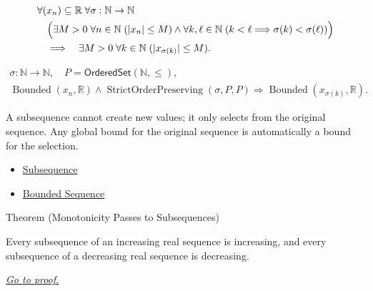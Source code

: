\begin{remark*}
\[
\begin{aligned}
&\forall (x_n)\subseteq\mathbb{R}\;\forall \sigma:\mathbb{N}\to\mathbb{N}\\
&\quad\Bigl(
  \exists M>0\;\forall n\in\mathbb{N}\;(|x_n|\le M)
  \land
  \forall k,\ell\in\mathbb{N}\;(k<\ell\Longrightarrow\sigma(k)<\sigma(\ell))
\Bigr)\\
&\quad\Longrightarrow\quad
\exists M>0\;\forall k\in\mathbb{N}\;(|x_{\sigma(k)}|\le M).
\end{aligned}
\]
\end{remark*}

\begin{remark*}
\[
\begin{gathered}
\sigma\colon\mathbb{N}\to\mathbb{N},\quad
P=\mathsf{OrderedSet}(\mathbb{N},\leq),\\
\operatorname{Bounded}(x_n,\mathbb{R})
\land
\operatorname{StrictOrderPreserving}(\sigma,P,P)
\Longrightarrow
\operatorname{Bounded}(x_{\sigma(k)},\mathbb{R}).
\end{gathered}
\]
\end{remark*}

\begin{remark*}[Interpretation]
A subsequence cannot create new values; it only selects from the original
sequence. Any global bound for the original sequence is automatically a bound
for the selection.
\end{remark*}

\begin{dependencies}
\begin{itemize}
  \item \hyperref[def:subsequence-of-sequence]{Subsequence}
  \item \hyperref[def:bounded-sequence]{Bounded Sequence}
\end{itemize}
\end{dependencies}


\begin{theorembox}{Theorem (Monotonicity Passes to Subsequences)}
\begin{theorem}
\label{thm:monotonicity-passes-to-subsequences}
Every subsequence of an increasing real sequence is increasing, and every
subsequence of a decreasing real sequence is decreasing.

\smallskip
\noindent
\hyperref[prf:monotonicity-passes-to-subsequences]{\textit{Go to proof.}}
\end{theorem}
\end{theorembox}

